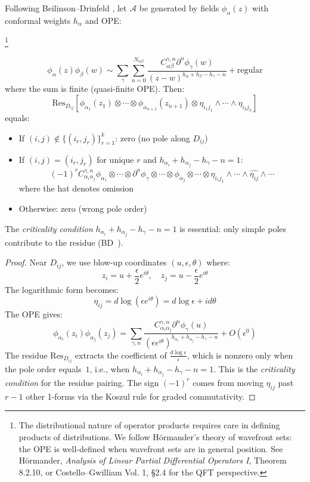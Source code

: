 \begin{theorem}\label{thm:residue-formula}
Following Beilinson--Drinfeld \cite[§3.7.4, p.228]{BD04}, 
let $\mathcal{A}$ be generated by fields $\phi_\alpha(z)$ with conformal weights $h_\alpha$ and OPE:

\footnote{The distributional nature of operator products requires care in defining 
products of distributions. We follow Hörmander's theory of wavefront sets: the OPE 
is well-defined when wavefront sets are in general position. See Hörmander, 
\textit{Analysis of Linear Partial Differential Operators I}, Theorem 8.2.10, or 
Costello--Gwilliam Vol. 1, \S2.4 for the QFT perspective.}

\[
\phi_\alpha(z)\phi_\beta(w) \sim \sum_{\gamma} \sum_{n=0}^{N_{\alpha\beta}} 
\frac{C^{\gamma,n}_{\alpha\beta} \partial^n\phi_\gamma(w)}{(z-w)^{h_\alpha + h_\beta - h_\gamma - n}}
+ \text{regular}
\]
where the sum is finite (quasi-finite OPE). Then:
\[
\text{Res}_{D_{ij}}[\phi_{\alpha_1}(z_1) \otimes \cdots \otimes \phi_{\alpha_{n+1}}(z_{n+1}) 
\otimes \eta_{i_1j_1} \wedge \cdots \wedge \eta_{i_kj_k}]
\]
equals:
\begin{itemize}
\item If $(i,j) \notin \{(i_r, j_r)\}_{r=1}^k$: zero (no pole along $D_{ij}$)
\item If $(i,j) = (i_r, j_r)$ for unique $r$ and $h_{\alpha_i} + h_{\alpha_j} - h_\gamma - n = 1$:
\[
(-1)^r C^{\gamma,n}_{\alpha_i\alpha_j} \phi_{\alpha_1} \otimes \cdots \otimes \partial^n\phi_\gamma \otimes \cdots 
\otimes \widehat{\phi_{\alpha_j}} \otimes \cdots \otimes \eta_{i_1j_1} \wedge \cdots \wedge \widehat{\eta_{ij}} \wedge \cdots
\]
where the hat denotes omission
\item Otherwise: zero (wrong pole order)
\end{itemize}

The \emph{criticality condition} $h_{\alpha_i} + h_{\alpha_j} - h_\gamma - n = 1$ is essential: only simple poles contribute to the residue (BD~\cite[\S3.7.4]{BD04}).
\end{theorem}
 
\begin{proof}
Near $D_{ij}$, we use blow-up coordinates $(u, \epsilon, \theta)$ where:
\[
z_i = u + \frac{\epsilon}{2}e^{i\theta}, \quad z_j = u - \frac{\epsilon}{2}e^{i\theta}
\]
The logarithmic form becomes:
\[
\eta_{ij} = d\log(\epsilon e^{i\theta}) = d\log\epsilon + id\theta
\]
The OPE gives:
\[
\phi_{\alpha_i}(z_i)\phi_{\alpha_j}(z_j) = \sum_{\gamma,n} 
\frac{C^{\gamma,n}_{\alpha_i\alpha_j} \partial^n\phi_\gamma(u)}{(\epsilon e^{i\theta})^{h_{\alpha_i} + h_{\alpha_j} - h_\gamma - n}}
+ O(\epsilon^0)
\]
The residue $\text{Res}_{D_{ij}}$ extracts the coefficient of
$\frac{d\log\epsilon}{\epsilon}$, which is nonzero only when the pole
order equals~$1$, i.e., when
$h_{\alpha_i} + h_{\alpha_j} - h_\gamma - n = 1$. This is the 
\emph{criticality condition} for the residue pairing. The sign $(-1)^r$ comes from 
moving $\eta_{ij}$ past $r-1$ other 1-forms via the Koszul rule for graded
commutativity.
\end{proof}
 
